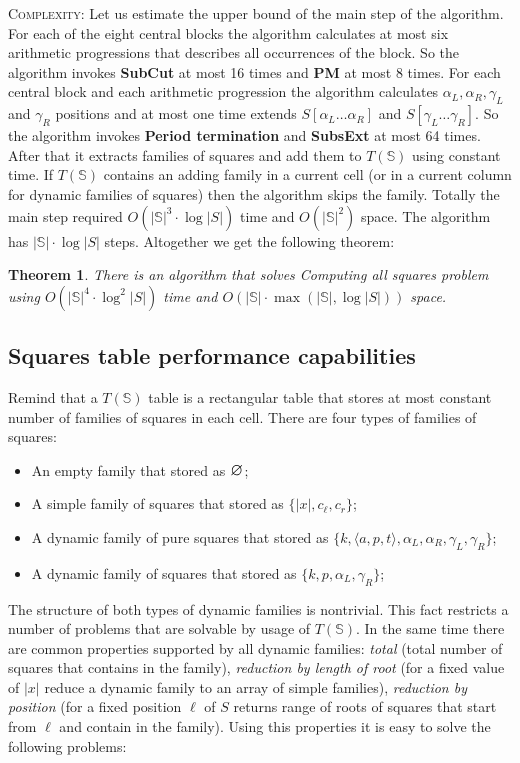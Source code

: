 \documentclass[11pt]{article}
\newtheorem{thm}{Theorem}[section]
\theoremstyle{break}
\newcommand{\prog}[3]{\langle #1, #2, #3\rangle}
\newcommand{\slp}[1]{\mathbb{#1}}
\newcommand{\substr}[2]{[#1\dots#2]}
\renewcommand{\emptyset}{
    \font\msbm = msbm10 at 12pt
    \mbox{\msbm \char 63}
}
\begin{document}
\noindent \textsc{Complexity:} Let us estimate the upper bound of the main step of the algorithm. For each of the
eight central blocks the algorithm calculates at most six arithmetic progressions that describes all occurrences of the block.
So the algorithm invokes \textbf{SubCut} at most 16 times and \textbf{PM} at most 8 times. For each central block and each arithmetic progression
the algorithm calculates $\alpha_L, \alpha_R, \gamma_L$ and $\gamma_R$ positions and at most one time extends $S\substr{\alpha_L}{\alpha_R}$ 
and $S\substr{\gamma_L}{\gamma_R}$. So the algorithm invokes \textbf{Period termination} and \textbf{SubsExt} at most 64 times. 
After that it extracts families of squares and add them to $T(\slp{S})$ using constant time.
If $T(\slp{S})$ contains an adding family in a current cell (or in a current column for dynamic families of squares) then the algorithm skips the family.
Totally the main step required $O(|\slp{S}|^3 \cdot \log |S|)$ time and $O(|\slp{S}|^2)$ space. The algorithm has $|\slp{S}| \cdot \log |S|$ steps.
Altogether we get the following theorem:

\begin{thm}
There is an algorithm that solves Computing all squares problem using $O(|\slp{S}|^4 \cdot \log^2{|S|})$ time and
$O(|\slp{S}| \cdot \max(|\slp{S}|, \log{|S|}))$ space.
\end{thm}

\subsection{Squares table performance capabilities}

Remind that a $T(\slp{S})$ table is a rectangular table that stores at most constant number of families of squares in each cell. There are four types of 
families of squares:

\begin{itemize}
  \item An empty family that stored as $\emptyset$;
  \item A simple family of squares that stored as $\{|x|, c_\ell, c_r \}$;
  \item A dynamic family of pure squares that stored as $\{k, \prog{a}{p}{t}, \alpha_L, \alpha_R, \gamma_L, \gamma_R\}$;
  \item A dynamic family of squares that stored as $\{k, p, \alpha_L, \gamma_R\}$;
\end{itemize}

The structure of both types of dynamic families is nontrivial. This fact restricts a number of problems that are solvable by usage of $T(\slp{S})$. 
In the same time there are common properties supported by all dynamic families: \emph{total} (total number of squares that contains in the family), 
\emph{reduction by length of root} (for a fixed value of $|x|$ reduce a dynamic family to an array of simple families), \emph{reduction
by position} (for a fixed position $\ell$ of $S$ returns range of roots of squares that start from $\ell$ and contain
in the family). Using this properties it is easy to solve the following problems:
\end{document}
